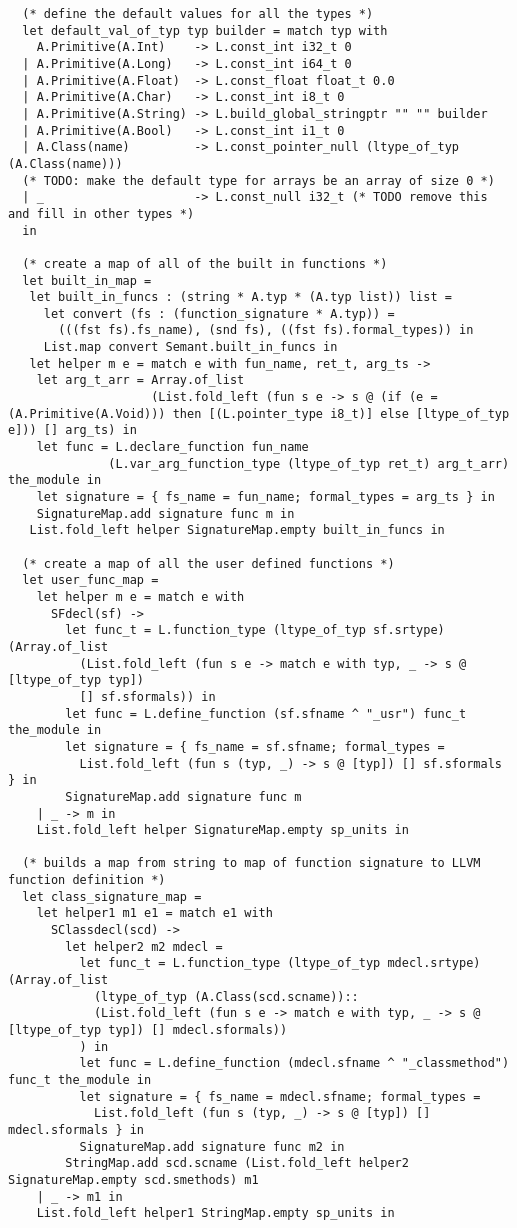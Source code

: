 \documentclass{article}
\begin{document}
\begin{verbatim}
  (* define the default values for all the types *)
  let default_val_of_typ typ builder = match typ with
    A.Primitive(A.Int)    -> L.const_int i32_t 0
  | A.Primitive(A.Long)   -> L.const_int i64_t 0
  | A.Primitive(A.Float)  -> L.const_float float_t 0.0
  | A.Primitive(A.Char)   -> L.const_int i8_t 0
  | A.Primitive(A.String) -> L.build_global_stringptr "" "" builder
  | A.Primitive(A.Bool)   -> L.const_int i1_t 0
  | A.Class(name)         -> L.const_pointer_null (ltype_of_typ (A.Class(name)))
  (* TODO: make the default type for arrays be an array of size 0 *)
  | _                     -> L.const_null i32_t (* TODO remove this and fill in other types *)
  in

  (* create a map of all of the built in functions *)
  let built_in_map =
   let built_in_funcs : (string * A.typ * (A.typ list)) list =
     let convert (fs : (function_signature * A.typ)) =
       (((fst fs).fs_name), (snd fs), ((fst fs).formal_types)) in
     List.map convert Semant.built_in_funcs in
   let helper m e = match e with fun_name, ret_t, arg_ts -> 
    let arg_t_arr = Array.of_list 
                    (List.fold_left (fun s e -> s @ (if (e = (A.Primitive(A.Void))) then [(L.pointer_type i8_t)] else [ltype_of_typ e])) [] arg_ts) in
    let func = L.declare_function fun_name 
              (L.var_arg_function_type (ltype_of_typ ret_t) arg_t_arr) the_module in
    let signature = { fs_name = fun_name; formal_types = arg_ts } in
    SignatureMap.add signature func m in
   List.fold_left helper SignatureMap.empty built_in_funcs in

  (* create a map of all the user defined functions *)
  let user_func_map =
    let helper m e = match e with 
      SFdecl(sf) ->
        let func_t = L.function_type (ltype_of_typ sf.srtype) (Array.of_list
          (List.fold_left (fun s e -> match e with typ, _ -> s @ [ltype_of_typ typ])
          [] sf.sformals)) in
        let func = L.define_function (sf.sfname ^ "_usr") func_t the_module in
        let signature = { fs_name = sf.sfname; formal_types =
          List.fold_left (fun s (typ, _) -> s @ [typ]) [] sf.sformals } in
        SignatureMap.add signature func m
    | _ -> m in
    List.fold_left helper SignatureMap.empty sp_units in

  (* builds a map from string to map of function signature to LLVM function definition *)
  let class_signature_map =
    let helper1 m1 e1 = match e1 with
      SClassdecl(scd) ->
        let helper2 m2 mdecl =
          let func_t = L.function_type (ltype_of_typ mdecl.srtype) (Array.of_list
            (ltype_of_typ (A.Class(scd.scname))::
            (List.fold_left (fun s e -> match e with typ, _ -> s @ [ltype_of_typ typ]) [] mdecl.sformals))
          ) in
          let func = L.define_function (mdecl.sfname ^ "_classmethod") func_t the_module in
          let signature = { fs_name = mdecl.sfname; formal_types =
            List.fold_left (fun s (typ, _) -> s @ [typ]) [] mdecl.sformals } in
          SignatureMap.add signature func m2 in
        StringMap.add scd.scname (List.fold_left helper2 SignatureMap.empty scd.smethods) m1
    | _ -> m1 in
    List.fold_left helper1 StringMap.empty sp_units in


\end{verbatim}
\end{document}
